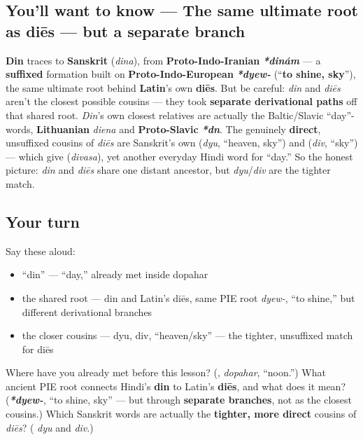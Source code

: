 \subsection*{You'll want to know — The same ultimate root as diēs — but a separate branch}
\textbf{Din} traces to \textbf{Sanskrit} \textbf{} (\emph{dina}), from \textbf{Proto-Indo-Iranian} \emph{\textbf{*dinám}} — a \textbf{suffixed} formation built on \textbf{Proto-Indo-European} \emph{\textbf{*dyew-}} (\textquotedblleft{}\textbf{to shine, sky}\textquotedblright{}), the same ultimate root behind \textbf{Latin}'s own \textbf{diēs}. But be careful: \emph{din} and \emph{diēs} aren't the closest possible cousins — they took \textbf{separate derivational paths} off that shared root. \emph{Din}'s own closest relatives are actually the Baltic/Slavic \textquotedblleft{}day\textquotedblright{}-words, \textbf{Lithuanian} \emph{diena} and \textbf{Proto-Slavic} \emph{\textbf{*dn}}. The genuinely \textbf{direct}, unsuffixed cousins of \emph{diēs} are Sanskrit's own \textbf{} (\emph{dyu}, \textquotedblleft{}heaven, sky\textquotedblright{}) and \textbf{} (\emph{div}, \textquotedblleft{}sky\textquotedblright{}) — which give \textbf{} (\emph{divasa}), yet another everyday Hindi word for \textquotedblleft{}day.\textquotedblright{} So the honest picture: \emph{din} and \emph{diēs} share one distant ancestor, but \emph{dyu}/\emph{div} are the tighter match.

\subsection*{Your turn}
Say these aloud:

\begin{itemize}
\raggedright
  \item \textquotedblleft{}din\textquotedblright{} — \textquotedblleft{}day,\textquotedblright{} already met inside dopahar
  \item the shared root — din and Latin's diēs, same PIE root \emph{dyew-}, \textquotedblleft{}to shine,\textquotedblright{} but different derivational branches
  \item the closer cousins — dyu, div, \textquotedblleft{}heaven/sky\textquotedblright{} — the tighter, unsuffixed match for diēs
\end{itemize}

\begin{tcolorbox}[breakable,colback=teal!4,colframe=teal!35!black,title={Before you move on}]
Where have you already met \textbf{} before this lesson? (\textbf{}, \emph{dopahar}, \textquotedblleft{}noon.\textquotedblright{}) What ancient PIE root connects Hindi's \textbf{din} to Latin's \textbf{diēs}, and what does it mean? (\emph{\textbf{*dyew-}}, \textquotedblleft{}to shine, sky\textquotedblright{} — but through \textbf{separate branches}, not as the closest cousins.) Which Sanskrit words are actually the \textbf{tighter, more direct} cousins of \emph{diēs}? (\textbf{} \emph{dyu} and \textbf{} \emph{div}.)
\end{tcolorbox}
